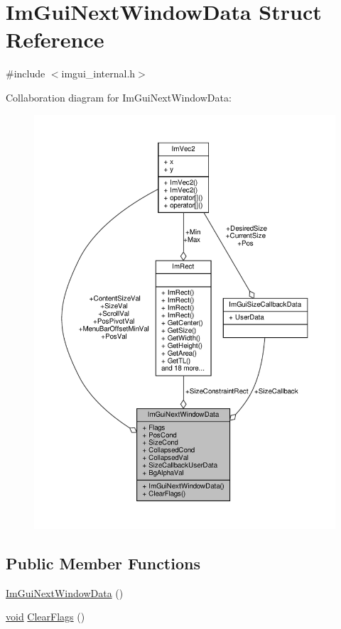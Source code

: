 \hypertarget{structImGuiNextWindowData}{}\section{Im\+Gui\+Next\+Window\+Data Struct Reference}
\label{structImGuiNextWindowData}


{\ttfamily \#include $<$imgui\+\_\+internal.\+h$>$}



Collaboration diagram for Im\+Gui\+Next\+Window\+Data\+:
\nopagebreak
\begin{figure}[H]
\begin{center}
\leavevmode
\includegraphics[width=350pt]{structImGuiNextWindowData__coll__graph}
\end{center}
\end{figure}
\subsection*{Public Member Functions}
\begin{DoxyCompactItemize}
\item 
\hyperlink{structImGuiNextWindowData_a0471ae42c04fce2e38c9cd8c37690b09}{Im\+Gui\+Next\+Window\+Data} ()
\item 
\hyperlink{imgui__impl__opengl3__loader_8h_ac668e7cffd9e2e9cfee428b9b2f34fa7}{void} \hyperlink{structImGuiNextWindowData_a9543431fafe3d0627fdecc5fa839487c}{Clear\+Flags} ()
\end{DoxyCompactItemize}
